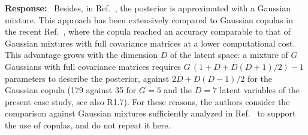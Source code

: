 \documentclass[11pt]{article}
\newenvironment{response}{\par\smallskip\noindent\color{resp}\textbf{Response:}\ }{\par}
\newcommand{\m}{\mathbf{m}}
\newcommand{\z}{\mathbf{z}}
\begin{document}
\begin{response}
Besides, in Ref.~\cite{Navamuel_wes2025}, the posterior is approximated with a Gaussian mixture. This approach has been extensively compared to Gaussian copulas in the recent Ref.~\cite{Arxiv_Navamuel2026copula2d}, where the copula reached an accuracy comparable to that of Gaussian mixtures with full covariance matrices at a lower computational cost.	This advantage grows with the dimension $D$ of the latent space: a mixture of $G$ Gaussians with full covariance matrices requires $G\,(1+D+D(D+1)/2)-1$ parameters to describe the posterior, against $2D+D(D-1)/2$ for the Gaussian copula (179 against 35 for $G=5$ and the $D=7$ latent variables of the present case study, see also R1.7).
For these reasons, the authors consider the comparison against Gaussian mixtures sufficiently analyzed in Ref.~\cite{Arxiv_Navamuel2026copula2d} to support the use of copulas, and do not repeat it here.




\end{response}
\end{document}
